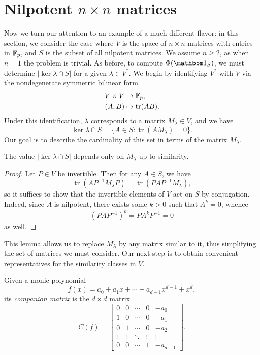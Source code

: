 \newcommand{\Mat}{\operatorname{Mat}}
\newcommand{\tr}{\operatorname{tr}}
\newcommand{\fact}{\operatorname{fact}}

\section{Nilpotent $n\times n$ matrices}\label{sec:part3}

Now we turn our attention to an example of a much different flavor: in this section, we consider the case where $V$ is the space of $n\times n$ matrices with entries in $\mathbb{F}_p$, and $S$ is the subset of all nilpotent matrices. We assume $n\ge 2$, as when $n=1$ the problem is trivial. As before, to compute $\Phi(\IND_S)$, we must determine $|\ker\lambda\cap S|$ for a given $\lambda\in V^*$. We begin by identifying $V^*$ with $V$ via the nondegenerate symmetric bilinear form
\begin{align*}
V\times V&\to\F_p,\\
(A,B)&\mapsto\tr(AB).
\end{align*}
Under this identification, $\lambda$ corresponds to a matrix $M_\lambda\in V$, and we have
\begin{equation}
\label{eqn:kerlambda}
\ker\lambda\cap S=\{A\in S:\tr(AM_\lambda)=0\}.
\end{equation}
Our goal is to describe the cardinality of this set in terms of the matrix $M_\lambda$.
\begin{lem}
\label{lem:sim}
The value $|\ker\lambda\cap S|$ depends only on $M_\lambda$ up to similarity.
\end{lem}
\begin{proof}
Let $P\in V$ be invertible. Then for any $A\in S$, we have
\begin{equation*}
\tr(AP^{-1}M_\lambda P)=\tr(PAP^{-1}M_\lambda),
\end{equation*}
so it suffices to show that the invertible elements of $V$ act on $S$ by conjugation. Indeed, since $A$ is nilpotent, there exists some $k>0$ such that $A^k=0$, whence
\begin{equation*}
(PAP^{-1})^k=PA^kP^{-1}=0
\end{equation*}
as well.
\end{proof}
This lemma allows us to replace $M_\lambda$ by any matrix similar to it, thus simplifying the set of matrices we must consider. Our next step is to obtain convenient representatives for the similarity classes in $V$.
\begin{notation}
Given a monic polynomial
\begin{equation*}
f(x)=a_0+a_1x+\cdots+a_{d-1}x^{d-1}+x^d,
\end{equation*}
its \emph{companion matrix} is the $d\times d$ matrix
\begin{equation*}
C(f)=\begin{bmatrix}
0&0&\cdots&0&-a_0\\
1&0&\cdots&0&-a_1\\
0&1&\cdots&0&-a_2\\
\vdots&\vdots&\ddots&\vdots&\vdots\\
0&0&\cdots&1&-a_{d-1}
\end{bmatrix}.
\end{equation*}
\end{notation}
